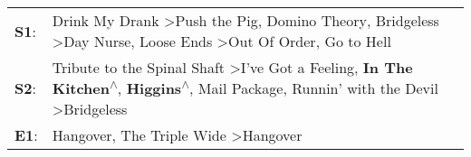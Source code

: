 \begin{supertabular}{p{0.03\textwidth}p{0.92\textwidth}}
 \textbf{S1}:  &               Drink My Drank\textsuperscript{} \textgreater \enspace Push the Pig\textsuperscript{}, \enspace Domino Theory\textsuperscript{}, \enspace Bridgeless\textsuperscript{} \textgreater \enspace Day Nurse\textsuperscript{}, \enspace Loose Ends\textsuperscript{} \textgreater \enspace Out Of Order\textsuperscript{}, \enspace Go to Hell\textsuperscript{}  \enspace  \\
 \textbf{S2}:  &  Tribute to the Spinal Shaft\textsuperscript{} \textgreater \enspace I've Got a Feeling\textsuperscript{}, \enspace \textbf{In The Kitchen\textsuperscript{$\wedge$}}, \enspace \textbf{Higgins\textsuperscript{$\wedge$}}, \enspace Mail Package\textsuperscript{}, \enspace Runnin' with the Devil\textsuperscript{} \textgreater \enspace Bridgeless\textsuperscript{}  \enspace  \\
 \textbf{E1}:  &                                                                                                                                                                                                                                                   Hangover\textsuperscript{}, \enspace The Triple Wide\textsuperscript{} \textgreater \enspace Hangover\textsuperscript{}  \enspace  \\
\end{supertabular}
